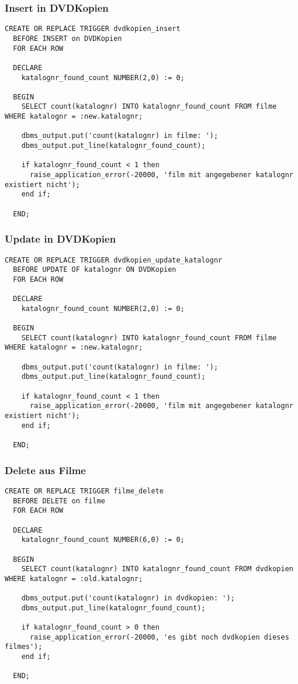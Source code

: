\documentclass[11pt,a4paper,parskip=half]{scrartcl}
\begin{document}
\subsubsection{Insert in DVDKopien}
\begin{lstlisting}
CREATE OR REPLACE TRIGGER dvdkopien_insert
  BEFORE INSERT on DVDKopien
  FOR EACH ROW
  
  DECLARE
    katalognr_found_count NUMBER(2,0) := 0;
    
  BEGIN
    SELECT count(katalognr) INTO katalognr_found_count FROM filme WHERE katalognr = :new.katalognr;
    
    dbms_output.put('count(katalognr) in filme: ');
    dbms_output.put_line(katalognr_found_count);
    
    if katalognr_found_count < 1 then
      raise_application_error(-20000, 'film mit angegebener katalognr existiert nicht');
    end if;
    
  END;
\end{lstlisting}

\subsubsection{Update in DVDKopien}
\begin{lstlisting}
CREATE OR REPLACE TRIGGER dvdkopien_update_katalognr
  BEFORE UPDATE OF katalognr ON DVDKopien
  FOR EACH ROW
  
  DECLARE
    katalognr_found_count NUMBER(2,0) := 0;
    
  BEGIN
    SELECT count(katalognr) INTO katalognr_found_count FROM filme WHERE katalognr = :new.katalognr;
    
    dbms_output.put('count(katalognr) in filme: ');
    dbms_output.put_line(katalognr_found_count);
    
    if katalognr_found_count < 1 then
      raise_application_error(-20000, 'film mit angegebener katalognr existiert nicht');
    end if;
    
  END;
\end{lstlisting}

\subsubsection{Delete aus Filme}
\begin{lstlisting}
CREATE OR REPLACE TRIGGER filme_delete
  BEFORE DELETE on filme
  FOR EACH ROW
  
  DECLARE
    katalognr_found_count NUMBER(6,0) := 0;
    
  BEGIN
    SELECT count(katalognr) INTO katalognr_found_count FROM dvdkopien WHERE katalognr = :old.katalognr;
    
    dbms_output.put('count(katalognr) in dvdkopien: ');
    dbms_output.put_line(katalognr_found_count);
    
    if katalognr_found_count > 0 then
      raise_application_error(-20000, 'es gibt noch dvdkopien dieses filmes');
    end if;
    
  END;
\end{lstlisting}
\end{document}
